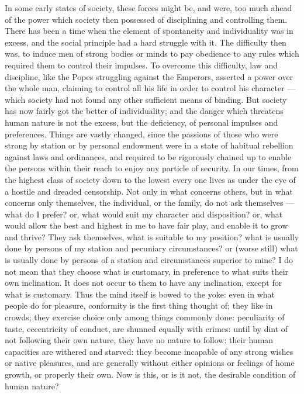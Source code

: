 \documentclass[12pt]{report}
\begin{document}
In some early states of society, these forces might be, and were, too much ahead of the power which society then possessed of disciplining and controlling them. There has been a time when the element of spontaneity and individuality was in excess, and the social principle had a hard struggle with it. The difficulty then was, to induce men of strong bodies or minds to pay obedience to any rules which required them to control their impulses. To overcome this difficulty, law and discipline, like the Popes struggling against the Emperors, asserted a power over the whole man, claiming to control all his life in order to control his character — which society had not found any other sufficient means of binding. But society has now fairly got the better of individuality; and the danger which threatens human nature is not the excess, but the deficiency, of personal impulses and preferences. Things are vastly changed, since the passions of those who were strong by station or by personal endowment were in a state of habitual rebellion against laws and ordinances, and required to be rigorously chained up to enable the persons within their reach to enjoy any particle of security. In our times, from the highest class of society down to the lowest every one lives as under the eye of a hostile and dreaded censorship. Not only in what concerns others, but in what concerns only themselves, the individual, or the family, do not ask themselves — what do I prefer? or, what would suit my character and disposition? or, what would allow the best and highest in me to have fair play, and enable it to grow and thrive? They ask themselves, what is suitable to my position? what is usually done by persons of my station and pecuniary circumstances? or (worse still) what is usually done by persons of a station and circumstances superior to mine? I do not mean that they choose what is customary, in preference to what suits their own inclination. It does not occur to them to have any inclination, except for what is customary. Thus the mind itself is bowed to the yoke: even in what people do for pleasure, conformity is the first thing thought of; they like in crowds; they exercise choice only among things commonly done: peculiarity of taste, eccentricity of conduct, are shunned equally with crimes: until by dint of not following their own nature, they have no nature to follow: their human capacities are withered and starved: they become incapable of any strong wishes or native pleasures, and are generally without either opinions or feelings of home growth, or properly their own. Now is this, or is it not, the desirable condition of human nature?
\end{document}
